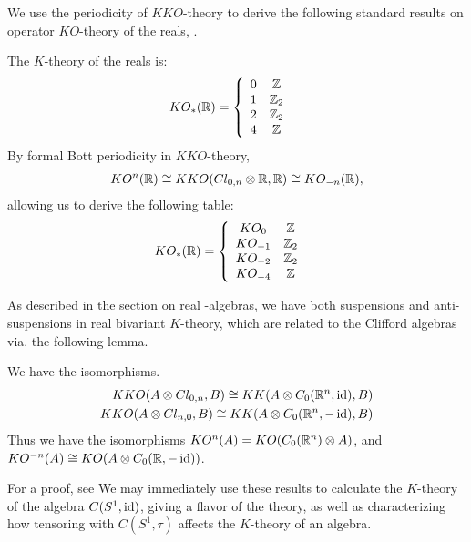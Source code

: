 We use the periodicity of $KKO$-theory to derive the following standard results on operator $KO$-theory of the reals, \cite[Section 1]{schroder}. 
\begin{example}
	The $K$-theory of the reals is: 
	\begin{align*}
		&KO_*(\mathbb{R})=\left \{\begin{array}{c c} 0 & \mathbb{Z}  \\ 1 & \mathbb{Z}_2 \\ 2 & \mathbb{Z}_2 \\  4 & \mathbb{Z}\end{array} \right .
	\end{align*}
	By formal Bott periodicity in $KKO$-theory,  \begin{align*}KO^n(\mathbb{R})\cong KKO(Cl_{0,n}\otimes \mathbb{R},\mathbb{R})\cong KO_{-n}(\mathbb{R}), \end{align*} allowing us to derive the following table:
	\begin{align*}
		&KO_*(\mathbb{R})=\left \{ \begin{array}{c c} KO_0 & \mathbb{Z}  \\ KO_{-1} & \mathbb{Z}_2 \\ KO_{-2} & \mathbb{Z}_2 \\ KO_{-4} & \mathbb{Z} \end{array} \right .
	\end{align*}
\end{example}
As described in the section on real \Cstar-algebras, we have both suspensions and anti-suspensions in real bivariant $K$-theory, which are related to the Clifford algebras via. the following lemma. 
\begin{lemma}
	We have the isomorphisms.
	\begin{align*}
		KKO(A\otimes Cl_{0,n},B)\cong KK(A\otimes C_0(\mathbb{R}^n,\operatorname{id}),B) \\
		KKO(A\otimes Cl_{n,0},B)\cong KK(A\otimes C_0(\mathbb{R}^n,-\operatorname{id}),B)
	\end{align*}
	Thus we have the isomorphisms $KO^n(A)=KO(C_0(\mathbb{R}^n)\otimes A)$, and $KO^{-n}(A)\cong KO(A\otimes C_0(\mathbb{R},-\operatorname{id}))$. 
\end{lemma}
For a proof, see \cite{kasparov}
We may immediately use these results to calculate the $K$-theory of the algebra $C(S^1,\operatorname{id})$, giving a flavor of the theory, as well as characterizing how tensoring with $C(S^1,\tau)$ affects the $K$-theory of an algebra. 

